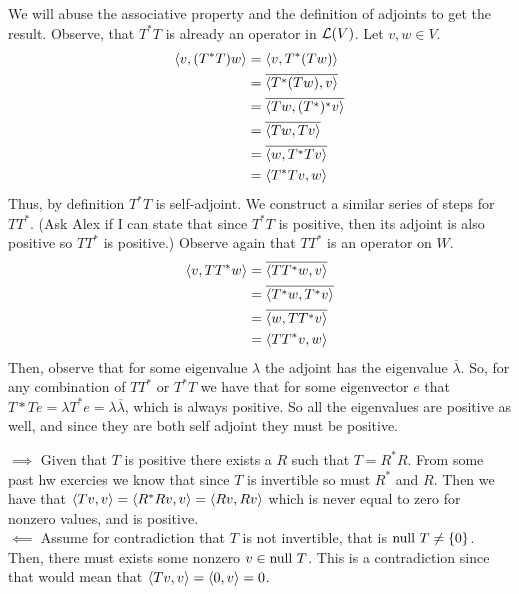 \documentclass[10pt, twocolumn]{article}
\begin{document}
\begin{q}[4]
    We will abuse the associative property and the definition of adjoints to get the result. 
    Observe, that $ T^*T $ is already an operator in $ \mathcal{L}(V) $. Let $ v, w \in V $.
    \begin{align*}
        \langle v, (T^* T) w\rangle &= \langle v, T^* (Tw)\rangle \\
        &= \overline{ \langle T^* (Tw), v\rangle } \\
        &= \overline{\langle Tw, (T^*)^* v\rangle} \\
        &= \overline{\langle Tw, Tv\rangle} \\
        &= \overline{\langle w, T^*Tv\rangle} \\
        &= \langle T^* Tv, w\rangle
    \end{align*}
    Thus, by definition $ T^*T $ is self-adjoint.
    We construct a similar series of steps for $ TT^* $. 
    (Ask Alex if I can state that since $ T^*T $ is positive, then its adjoint is also positive so $ TT^* $ is positive.)
    Observe again that $ TT^* $ is an operator on $ W $. 
    \begin{align*}
        \langle v, TT^* w\rangle &= \overline{\langle TT^* w, v\rangle} \\
        &= \overline{\langle T^* w, T^* v\rangle} \\
        &= \overline{\langle w, TT^* v\rangle} \\
        &= \langle TT^* v, w\rangle
    \end{align*}
    Then, observe that for some eigenvalue $ \lambda $ the adjoint has the eigenvalue $ \overline{\lambda} $. 
    So, for any combination of $ TT^* $ or $ T^*T $ we have that for some eigenvector $ e $ that $ T*Te = \lambda T^*e = \lambda \overline{\lambda} $, which is always positive.
    So all the eigenvalues are positive as well, and since they are both self adjoint they must be positive.
\end{q}

\begin{q}[7]
    $ \implies $ Given that $ T $ is positive there exists a $ R $ such that $ T = R^* R $. 
    From some past hw exercies we know that since $ T $ is invertible so must $ R^* $ and $ R $.
    Then we have that $ \langle Tv, v\rangle = \langle R^*Rv, v\rangle = \langle Rv, Rv\rangle $ which is never equal to zero for nonzero values, and is positive. \\
    $ \impliedby $ Assume for contradiction that $ T $ is not invertible, that is $ \text{null } T \neq \{0\} $. 
    Then, there must exists some nonzero $ v \in \text{null } T $. 
    This is a contradiction since that would mean that $ \langle Tv, v\rangle = \langle 0, v\rangle = 0 $.
\end{q}
\end{document}
